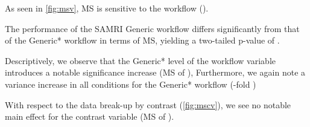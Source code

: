 As seen in \cref{fig:msv}, MS is sensitive to
the workflow
().


The performance of the SAMRI Generic workflow differs significantly from that of the Generic* workflow in terms of MS, yielding a two-tailed p-value of .

Descriptively, we observe that the Generic* level of the workflow variable introduces a notable significance increase
(MS of ),
Furthermore, we again note a variance increase in all conditions for the Generic* workflow
(-fold
)

With respect to the data break-up by contrast (\cref{fig:mscv}), we see no notable main effect for the contrast variable
(MS of ).

